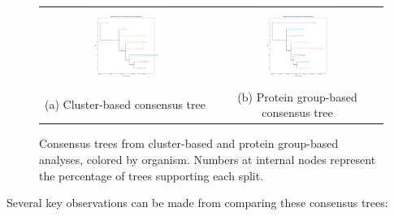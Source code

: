 \documentclass[11pt, a4paper, hidelinks]{article}
\begin{document}
\begin{figure}[H]
    \centering
    \begin{tabular}{cc}
        \includegraphics[width=0.45\textwidth]{clusters_consensus_colored.png} &
        \includegraphics[width=0.45\textwidth]{groups_consensus_colored.png} \\
        (a) Cluster-based consensus tree & (b) Protein group-based consensus tree
    \end{tabular}
    \caption{Consensus trees from cluster-based and protein group-based analyses, colored by organism. Numbers at internal nodes represent the percentage of trees supporting each split.}
    \label{fig:consensus_trees}
\end{figure}

Several key observations can be made from comparing these consensus trees:
\end{document}
